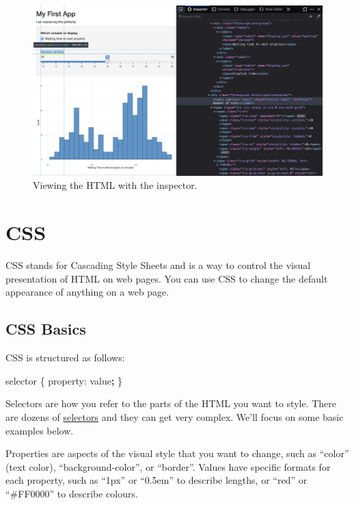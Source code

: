 \documentclass[
]{book}
\newenvironment{Shaded}{\begin{snugshade}}{\end{snugshade}}
\newcommand{\NormalTok}[1]{#1}
\newcommand{\OperatorTok}[1]{\textcolor[rgb]{0.81,0.36,0.00}{\textbf{#1}}}
\begin{document}
\begin{figure}

{\centering \includegraphics[width=1\linewidth]{images/inspector} 

}

\caption{Viewing the HTML with the inspector.}\label{fig:inspector}
\end{figure}

\hypertarget{css}{%
\section{CSS}\label{css}}

CSS stands for Cascading Style Sheets and is a way to control the visual presentation of HTML on web pages. You can use CSS to change the default appearance of anything on a web page.

\hypertarget{css-basics}{%
\subsection{CSS Basics}\label{css-basics}}

CSS is structured as follows:

\begin{Shaded}
\begin{Highlighting}[]
\NormalTok{selector \{ property: value}\OperatorTok{;}\NormalTok{ \}}
\end{Highlighting}
\end{Shaded}

Selectors are how you refer to the parts of the HTML you want to style. There are dozens of \href{https://www.w3schools.com/cssref/css_selectors.asp}{selectors} and they can get very complex. We'll focus on some basic examples below.

Properties are aspects of the visual style that you want to change, such as ``color'' (text color), ``background-color'', or ``border''. Values have specific formats for each property, such as ``1px'' or ``0.5em'' to describe lengths, or ``red'' or ``\#FF0000'' to describe colours.
\end{document}
